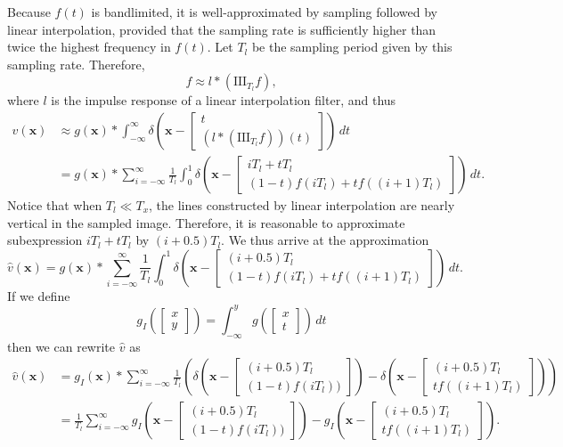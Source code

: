 \documentclass{article}
\let\V\mathbf
\begin{document}
Because $f(t)$ is bandlimited, it is well-approximated by sampling followed by linear interpolation, provided that the sampling rate is sufficiently higher than twice the highest frequency in $f(t)$.  Let $T_l$ be the sampling period given by this sampling rate.  Therefore,
\[
f \approx l*(\mathrm{III}_{T_l} f),
\]
where $l$ is the impulse response of a linear interpolation filter, and thus
\begin{align*}
v(\V x) &\approx g(\V x)*\int_{-\infty}^{\infty} \delta\left(\V x - \begin{bmatrix}t\\(l*(\mathrm{III}_{T_l} f))(t)\end{bmatrix}\right)\,dt\\
&= g(\V x)*\sum_{i=-\infty}^{\infty}\frac{1}{T_l}\int_{0}^{1}\delta\left(\V x - \begin{bmatrix}iT_l + tT_l\\(1 - t)f(iT_l) + tf((i+1)T_l)\end{bmatrix}\right)\,dt.
\end{align*}
Notice that when $T_l \ll T_x$, the lines constructed by linear interpolation are nearly vertical in the sampled image.  Therefore, it is reasonable to approximate subexpression $iT_l + tT_l$ by $(i + 0.5)T_l$.  We thus arrive at the approximation
\[
\hat v(\V x) = g(\V x)*\sum_{i=-\infty}^{\infty}\frac{1}{T_l}\int_{0}^{1}\delta\left(\V x - \begin{bmatrix}(i + 0.5)T_l\\(1 - t)f(iT_l) + tf((i+1)T_l)\end{bmatrix}\right)\,dt.
\]
If we define
\[
g_I\left(\begin{bmatrix}x\\y\end{bmatrix}\right) = \int_{-\infty}^y g\left(\begin{bmatrix}x\\t\end{bmatrix}\right)\,dt
\]
then we can rewrite $\hat v$ as
\begin{align*}
\hat v(\V x) &= g_I(\V x)*\sum_{i=-\infty}^{\infty}\frac{1}{T_l}\left(
\delta\left(\V x - \begin{bmatrix}(i + 0.5)T_l\\(1 - t)f(iT_l))\end{bmatrix}\right) -
\delta\left(\V x - \begin{bmatrix}(i + 0.5)T_l\\tf((i+1)T_l)\end{bmatrix}\right)\right)\\
&= \frac{1}{T_l}\sum_{i=-\infty}^{\infty}
g_I\left(\V x - \begin{bmatrix}(i + 0.5)T_l\\(1 - t)f(iT_l))\end{bmatrix}\right) -
g_I\left(\V x - \begin{bmatrix}(i + 0.5)T_l\\tf((i+1)T_l)\end{bmatrix}\right).
\end{align*}
\end{document}
